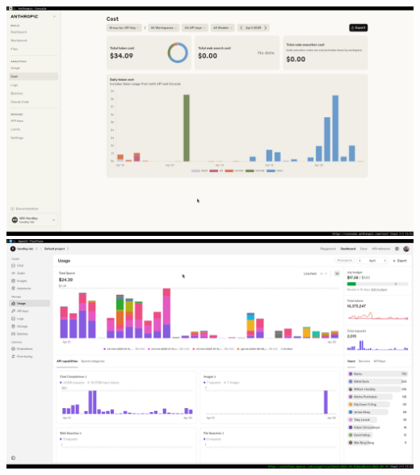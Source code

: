\documentclass[aspectratio=169]{beamer}
\begin{document}
\begin{frame}
\begin{columns}
        \includegraphics[width=\textwidth]{figures/cost_demo1.png}
        \includegraphics[width=\textwidth]{figures/cost_demo2.png}
    \end{columns}
\end{frame}
\end{document}
